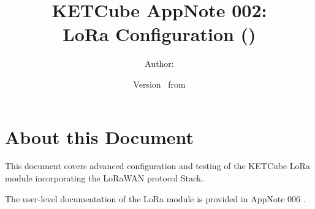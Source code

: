  




\title{\UWBLogo KETCube AppNote 002:\\ LoRa Configuration (\vhCurrentVersion)}

\author{Author: \vhListAllAuthorsLongWithAbbrev}
\date{Version \vhCurrentVersion\ from \vhCurrentDate}

  




  


\section*{About this Document}


This document covers advanced configuration and testing of the KETCube LoRa module incorporating the LoRaWAN protocol Stack. 

The user-level documentation of the LoRa module is provided in AppNote 006 \cite{ZCU:KETCubeAppNote006:09-2019}.

\setcounter{tocdepth}{1}
\tableofcontents
\clearpage

\listoffigures
\listoftables
\begin{versionhistory}
\end{versionhistory}
\setcounter{table}{0}

